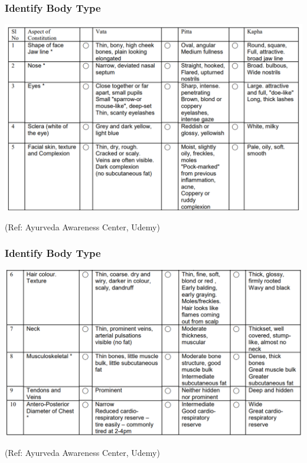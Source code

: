 \begin{frame}[fragile]\frametitle{Identify Body Type}

\begin{center}
\includegraphics[width=\linewidth,keepaspectratio]{images/bt1}
\end{center}

{\tiny (Ref: Ayurveda Awareness Center, Udemy)}

\end{frame}


\begin{frame}[fragile]\frametitle{Identify Body Type}

\begin{center}
\includegraphics[width=\linewidth,keepaspectratio]{images/bt2}
\end{center}

{\tiny (Ref: Ayurveda Awareness Center, Udemy)}

\end{frame}


